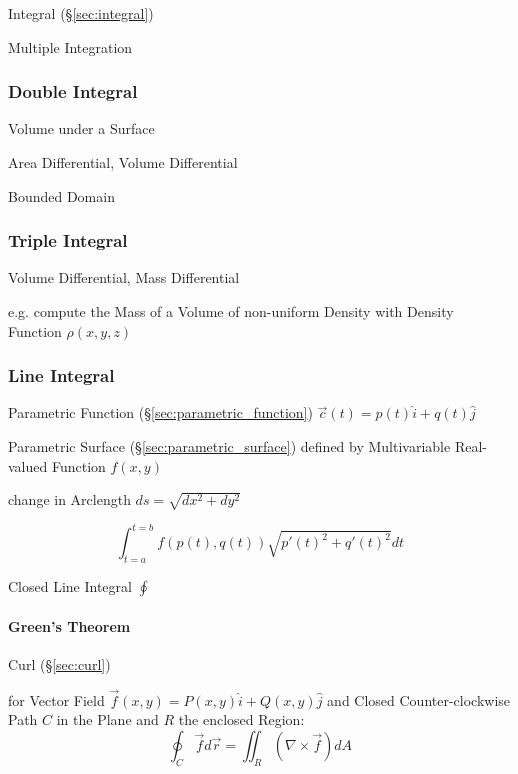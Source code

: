 Integral (\S\ref{sec:integral})

Multiple Integration



\subsubsection{Double Integral}\label{sec:double_integral}

Volume under a Surface

Area Differential, Volume Differential

Bounded Domain



\subsubsection{Triple Integral}\label{sec:triple_integral}

Volume Differential, Mass Differential

e.g. compute the Mass of a Volume of non-uniform Density with Density Function
$\rho(x,y,z)$



\subsubsection{Line Integral}\label{sec:line_integral}

Parametric Function (\S\ref{sec:parametric_function}) $\vec{c}(t) = p(t)\hat{i}
+ q(t)\hat{j}$

Parametric Surface (\S\ref{sec:parametric_surface}) defined by Multivariable
Real-valued Function $f(x,y)$

change in Arclength $ds = \sqrt{dx^2 + dy^2}$

\[
  \int_{t=a}^{t=b} f(p(t),q(t)) \sqrt{p'(t)^2 + q'(t)^2} dt
\]

Closed Line Integral $\oint$



\paragraph{Green's Theorem}\label{sec:greens_theorem}\hfill

Curl (\S\ref{sec:curl})

for Vector Field $\vec{f}(x,y) = P(x,y)\hat{i} + Q(x,y)\hat{j}$ and Closed
Counter-clockwise Path $C$ in the Plane and $R$ the enclosed Region:
\[
  \oint_C \vec{f} d\vec{r} = \iint_R (\nabla \times \vec{f}) dA
\]

